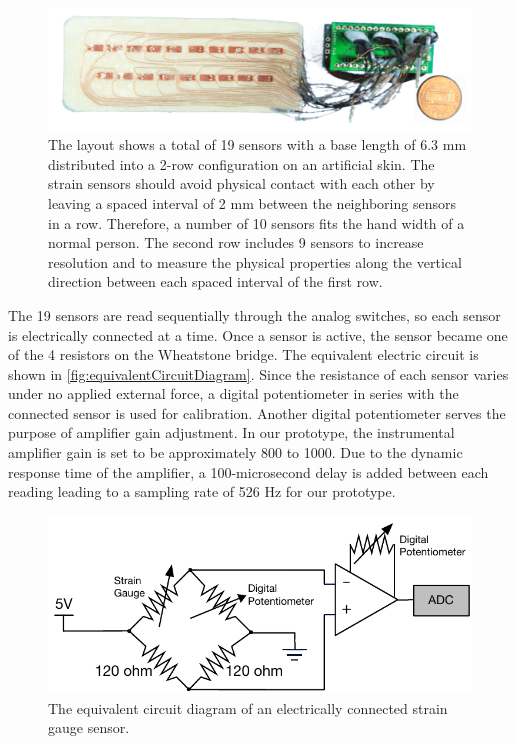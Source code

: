 \documentclass{sigchi}
\begin{document}
\begin{figure}
 \begin{center}
  \includegraphics[width=1\columnwidth]{figures/prototypeV2.jpg}
  \caption{The layout shows a total of 19 sensors with a base length of 6.3 mm distributed into a 2-row configuration on an artificial skin. The strain sensors should avoid physical contact with each other by leaving a spaced interval of 2 mm between the neighboring sensors in a row. Therefore, a number of 10 sensors fits the hand width of a normal person. The second row includes 9 sensors to increase resolution and to measure the physical properties along the vertical direction between each spaced interval of the first row.}
  \label{fig:tie}
  \end{center}
\end{figure}

The 19 sensors are read sequentially through the analog switches, so each sensor is electrically connected at a time. Once a sensor is active, the sensor became one of the 4 resistors on the Wheatstone bridge. The equivalent electric circuit is shown in \autoref{fig:equivalentCircuitDiagram}. Since the resistance of each sensor varies under no applied external force, a digital potentiometer in series with the connected sensor is used for calibration. Another digital potentiometer serves the purpose of amplifier gain adjustment. In our prototype, the instrumental amplifier gain is set to be approximately 800 to 1000. Due to the dynamic response time of the amplifier, a 100-microsecond delay is added between each reading leading to a sampling rate of 526 Hz for our prototype.

\begin{figure}
  \begin{center}
  \includegraphics[width=1\columnwidth]{figures/EquivalentDiagram.pdf}
  \caption{The equivalent circuit diagram of an electrically connected strain gauge sensor.}
  \label{fig:equivalentCircuitDiagram}
  \end{center}
\end{figure}
\end{document}
